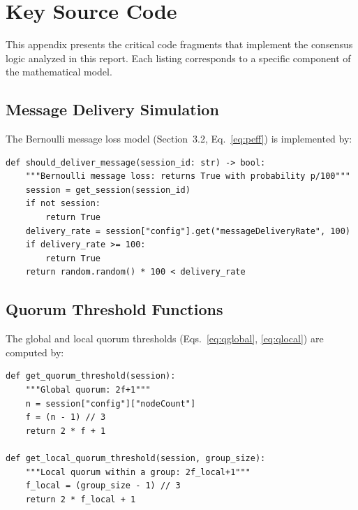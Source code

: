 \documentclass[12pt,a4paper]{article}
\begin{document}
\section{Key Source Code}
\label{app:code}

This appendix presents the critical code fragments that implement the consensus logic analyzed in this report. Each listing corresponds to a specific component of the mathematical model.

\subsection{Message Delivery Simulation}

The Bernoulli message loss model (Section~3.2, Eq.~\ref{eq:peff}) is implemented by:

\begin{lstlisting}[caption={Message delivery simulation (\texttt{state.py})}, label=lst:deliver]
def should_deliver_message(session_id: str) -> bool:
    """Bernoulli message loss: returns True with probability p/100"""
    session = get_session(session_id)
    if not session:
        return True
    delivery_rate = session["config"].get("messageDeliveryRate", 100)
    if delivery_rate >= 100:
        return True
    return random.random() * 100 < delivery_rate
\end{lstlisting}

\subsection{Quorum Threshold Functions}

The global and local quorum thresholds (Eqs.~\ref{eq:qglobal}, \ref{eq:qlocal}) are computed by:

\begin{lstlisting}[caption={Quorum thresholds (\texttt{consensus\_engine.py})}, label=lst:quorum]
def get_quorum_threshold(session):
    """Global quorum: 2f+1"""
    n = session["config"]["nodeCount"]
    f = (n - 1) // 3
    return 2 * f + 1

def get_local_quorum_threshold(session, group_size):
    """Local quorum within a group: 2f_local+1"""
    f_local = (group_size - 1) // 3
    return 2 * f_local + 1
\end{lstlisting}
\end{document}
